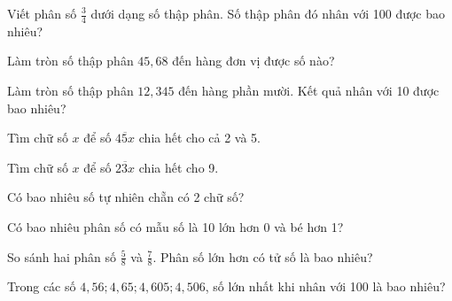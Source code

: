 \begin{ex}
  Viết phân số $\frac{3}{4}$ dưới dạng số thập phân. Số thập phân đó nhân với 100 được bao nhiêu?
\end{ex}

\begin{ex}
  Làm tròn số thập phân $45{,}68$ đến hàng đơn vị được số nào?
\end{ex}

\begin{ex}
  Làm tròn số thập phân $12{,}345$ đến hàng phần mười. Kết quả nhân với 10 được bao nhiêu?
\end{ex}

\begin{ex}
  Tìm chữ số $x$ để số $\overline{45x}$ chia hết cho cả 2 và 5.
\end{ex}

\begin{ex}
  Tìm chữ số $x$ để số $\overline{23x}$ chia hết cho 9.
\end{ex}

\begin{ex}
  Có bao nhiêu số tự nhiên chẵn có 2 chữ số?
\end{ex}

\begin{ex}
  Có bao nhiêu phân số có mẫu số là 10 lớn hơn 0 và bé hơn 1?
\end{ex}

\begin{ex}
  So sánh hai phân số $\frac{5}{8}$ và $\frac{7}{8}$. Phân số lớn hơn có tử số là bao nhiêu?
\end{ex}

\begin{ex}
  Trong các số $4{,}56; 4{,}65; 4{,}605; 4{,}506$, số lớn nhất khi nhân với 100 là bao nhiêu?
\end{ex}

